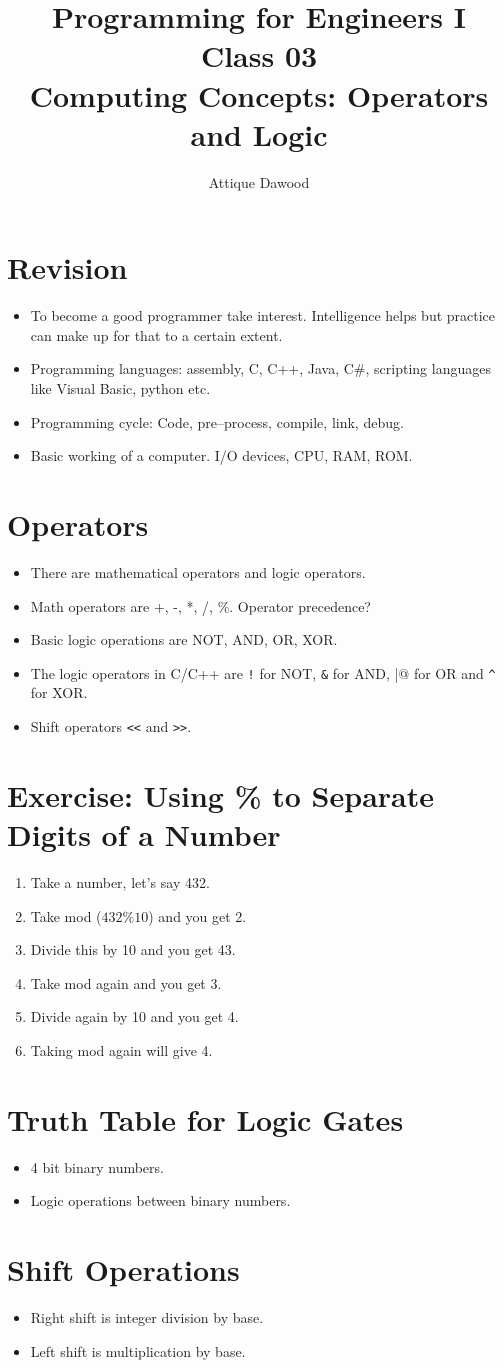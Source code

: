 \documentclass[12pt,a4paper]{article}
\title{\vspace{-2cm}Programming for Engineers I\\Class 03\\Computing Concepts: Operators and Logic}
\author{Attique Dawood}
\begin{document}
\maketitle
\section{Revision}
\begin{itemize}
\item To become a good programmer take interest. Intelligence helps but practice can make up for that to a certain extent.
\item Programming languages: assembly, C, C++, Java, C\#, scripting languages like Visual Basic, python etc.
\item Programming cycle: Code, pre--process, compile, link, debug.
\item Basic working of a computer. I/O devices, CPU, RAM, ROM.
\end{itemize}
\section{Operators}
\begin{itemize}
\item There are mathematical operators and logic operators.
\item Math operators are +, -, *, /, \%. Operator precedence?
\item Basic logic operations are NOT, AND, OR, XOR.
\item The logic operators in C/C++ are \verb|!| for NOT, \verb|&| for AND, \verb@|@ for OR and \verb|^| for XOR.
\item Shift operators \verb|<<| and \verb|>>|.
\end{itemize}
\section{Exercise: Using \% to Separate Digits of a Number}
\begin{enumerate}
\item Take a number, let's say 432.
\item Take mod ($432 \% 10$) and you get 2.
\item Divide this by 10 and you get 43.
\item Take mod again and you get 3.
\item Divide again by 10 and you get 4.
\item Taking mod again will give 4.
\end{enumerate}
\section{Truth Table for Logic Gates}
\begin{itemize}
\item 4 bit binary numbers.
\item Logic operations between binary numbers.
\end{itemize}
\section{Shift Operations}
\begin{itemize}
\item Right shift is integer division by base.
\item Left shift is multiplication by base.
\end{itemize}
\end{document}
